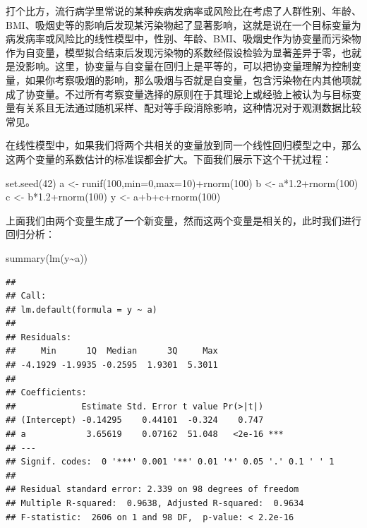 \documentclass[]{tufte-book}
\newenvironment{Shaded}{}{}
\newcommand{\AttributeTok}[1]{\textcolor[rgb]{0.49,0.56,0.16}{#1}}
\newcommand{\DecValTok}[1]{\textcolor[rgb]{0.25,0.63,0.44}{#1}}
\newcommand{\FloatTok}[1]{\textcolor[rgb]{0.25,0.63,0.44}{#1}}
\newcommand{\FunctionTok}[1]{\textcolor[rgb]{0.02,0.16,0.49}{#1}}
\newcommand{\NormalTok}[1]{#1}
\newcommand{\OtherTok}[1]{\textcolor[rgb]{0.00,0.44,0.13}{#1}}
\newcommand{\SpecialCharTok}[1]{\textcolor[rgb]{0.25,0.44,0.63}{#1}}
\begin{document}
打个比方，流行病学里常说的某种疾病发病率或风险比在考虑了人群性别、年龄、BMI、吸烟史等的影响后发现某污染物起了显著影响，这就是说在一个目标变量为病发病率或风险比的线性模型中，性别、年龄、BMI、吸烟史作为协变量而污染物作为自变量，模型拟合结束后发现污染物的系数经假设检验为显著差异于零，也就是没影响。这里，协变量与自变量在回归上是平等的，可以把协变量理解为控制变量，如果你考察吸烟的影响，那么吸烟与否就是自变量，包含污染物在内其他项就成了协变量。不过所有考察变量选择的原则在于其理论上或经验上被认为与目标变量有关系且无法通过随机采样、配对等手段消除影响，这种情况对于观测数据比较常见。

在线性模型中，如果我们将两个共相关的变量放到同一个线性回归模型之中，那么这两个变量的系数估计的标准误都会扩大。下面我们展示下这个干扰过程：

\begin{Shaded}
\begin{Highlighting}[]
\FunctionTok{set.seed}\NormalTok{(}\DecValTok{42}\NormalTok{)}
\NormalTok{a }\OtherTok{\textless{}{-}} \FunctionTok{runif}\NormalTok{(}\DecValTok{100}\NormalTok{,}\AttributeTok{min=}\DecValTok{0}\NormalTok{,}\AttributeTok{max=}\DecValTok{10}\NormalTok{)}\SpecialCharTok{+}\FunctionTok{rnorm}\NormalTok{(}\DecValTok{100}\NormalTok{)}
\NormalTok{b }\OtherTok{\textless{}{-}}\NormalTok{ a}\SpecialCharTok{*}\FloatTok{1.2}\SpecialCharTok{+}\FunctionTok{rnorm}\NormalTok{(}\DecValTok{100}\NormalTok{)}
\NormalTok{c }\OtherTok{\textless{}{-}}\NormalTok{ b}\SpecialCharTok{*}\FloatTok{1.2}\SpecialCharTok{+}\FunctionTok{rnorm}\NormalTok{(}\DecValTok{100}\NormalTok{)}
\NormalTok{y }\OtherTok{\textless{}{-}}\NormalTok{ a}\SpecialCharTok{+}\NormalTok{b}\SpecialCharTok{+}\NormalTok{c}\SpecialCharTok{+}\FunctionTok{rnorm}\NormalTok{(}\DecValTok{100}\NormalTok{)}
\end{Highlighting}
\end{Shaded}

上面我们由两个变量生成了一个新变量，然而这两个变量是相关的，此时我们进行回归分析：

\begin{Shaded}
\begin{Highlighting}[]
\FunctionTok{summary}\NormalTok{(}\FunctionTok{lm}\NormalTok{(y}\SpecialCharTok{\textasciitilde{}}\NormalTok{a))}
\end{Highlighting}
\end{Shaded}

\begin{verbatim}
## 
## Call:
## lm.default(formula = y ~ a)
## 
## Residuals:
##     Min      1Q  Median      3Q     Max 
## -4.1929 -1.9935 -0.2595  1.9301  5.3011 
## 
## Coefficients:
##             Estimate Std. Error t value Pr(>|t|)    
## (Intercept) -0.14295    0.44101  -0.324    0.747    
## a            3.65619    0.07162  51.048   <2e-16 ***
## ---
## Signif. codes:  0 '***' 0.001 '**' 0.01 '*' 0.05 '.' 0.1 ' ' 1
## 
## Residual standard error: 2.339 on 98 degrees of freedom
## Multiple R-squared:  0.9638, Adjusted R-squared:  0.9634 
## F-statistic:  2606 on 1 and 98 DF,  p-value: < 2.2e-16
\end{verbatim}
\end{document}
